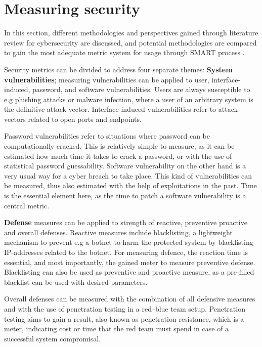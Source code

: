 \section{Measuring security}

In this section, different methodologies and perspectives gained
through literature review for cybersecurity are discussed, and
potential methodologies are compared to gain the most adequate metric
system for usage through SMART process \cite{payne2006guide}.

Security metrics can be divided to address four separate themes:
\textbf{System vulnerabilities}; measuring vulnerabilities can be
applied to user, interface-induced, password, and software
vulnerabilities. Users are always susceptible to e.g phishing attacks
or malware infection, where a user of an arbitrary system is the
definitive attack vector. Interface-induced vulnerabilities refer to
attack vectors related to open ports and
endpoints. \cite{pendleton2016survey}

Password vulnerabilities refer to situations where password can be
computationally cracked. This is relatively simple to measure, as it
can be estimated how much time it takes to crack a password, or with
the use of statistical password guessability. Software vulnerability
on the other hand is a very usual way for a cyber breach to take
place. This kind of vulnerabilities can be measured, thus also
estimated with the help of exploitations in the past. Time is the
essential element here, as the time to patch a software vulnerability
is a central metric. \cite{pendleton2016survey}

\textbf{Defense} measures can be applied to strength of reactive,
preventive proactive and overall defenses. Reactive measures include
blacklisting, a lightweight mechanism to prevent e.g a botnet to harm
the protected system by blacklisting IP-addresses related to the
botnet. For measuring defence, the reaction time is essential, and
most importantly, the gained meter to measure preventive
defense. Blacklisting can also be used as preventive and proactive
measure, as a pre-filled blacklist can be used with desired
parameters. \cite{pendleton2016survey, ramos2017model}

Overall defenses can be measured with the combination of all defensive
measures and with the use of penetration testing in a red–blue team
setup. Penetration testing aims to gain a result, also known as
penetration resistance, which is a meter, indicating cost or time that
the red team must spend in case of a successful system
compromisal. \cite{pendleton2016survey, ramos2017model}

